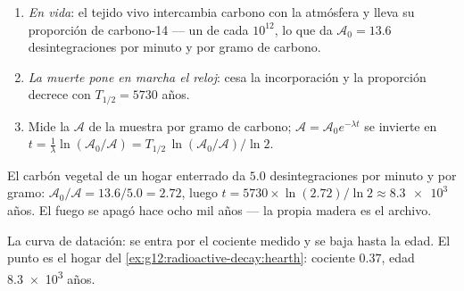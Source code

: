 \begin{method}\label{met:g12:radioactive-decay:carbon}
\begin{enumerate}
  \item \emph{En vida}: el tejido vivo intercambia carbono con la atmósfera y lleva su
        proporción de carbono-14 --- un  de cada $10^{12}$, lo que da
        $\mathcal A_0 = 13.6$ desintegraciones por minuto y por gramo de carbono.
  \item \emph{La muerte pone en marcha el reloj}: cesa la incorporación y la
        proporción decrece con $T_{1/2} = \num{5730}$ años.
  \item Mide la  $\mathcal A$ de la muestra por gramo de carbono;
        $\mathcal A = \mathcal A_0 e^{-\lambda t}$ se invierte en
        $t = \frac{1}{\lambda}\ln(\mathcal A_0/\mathcal A)
        = T_{1/2}\,\ln(\mathcal A_0/\mathcal A)/\ln 2$.
\end{enumerate}
\end{method}

\begin{example}\label{ex:g12:radioactive-decay:hearth}
El carbón vegetal de un hogar enterrado da $5.0$ desintegraciones por minuto y por
gramo: $\mathcal A_0/\mathcal A = 13.6/5.0 = 2.72$, luego
$t = \num{5730} \times \ln(2.72)/\ln 2 \approx \num{8.3e3}$ años. El fuego se apagó
hace ocho mil años --- la propia madera es el archivo.
\end{example}

\begin{omfigure}

{\small La curva de datación: se entra por el cociente medido y se baja hasta la edad.
El punto es el hogar del \cref{ex:g12:radioactive-decay:hearth}: cociente $0.37$, edad
\num{8.3e3} años.}
\end{omfigure}

